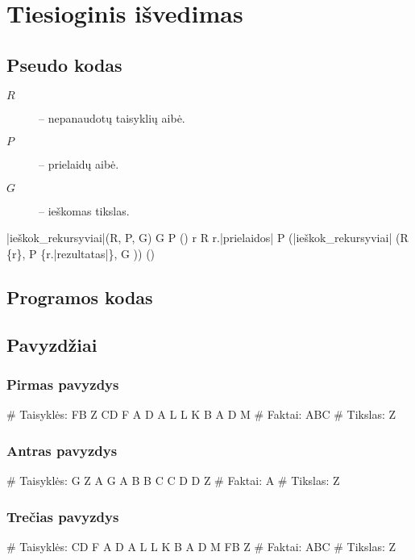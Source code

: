 \chapter{Tiesioginis išvedimas}

\section{Pseudo kodas}

\begin{description}
  \item[$R$] – nepanaudotų taisyklių aibė.
  \item[$P$] – prielaidų aibė.
  \item[$G$] – ieškomas tikslas.
\end{description}
\begin{program}
  \FUNCT |ieškok_rekursyviai|(R, P, G) \BODY
    \IF G \in P \THEN \EXIT(\true) \FI
    \FOREACH r \in R \; \DO
      \IF r.|prielaidos| \subseteq P
      \THEN \EXIT(|ieškok_rekursyviai|%
        (R \setminus \{r\}, P \cup \{r.|rezultatas|\}, G ))
      \FI
    \OD
    \EXIT(\false)%
  \ENDFUNCT
\end{program}

\section{Programos kodas}


\section{Pavyzdžiai}

\subsection{Pirmas pavyzdys}

\begin{pythonaienv}[fc]
# Taisyklės:
FB Z
CD F
A D
A L
L K
B A
D M
# Faktai:
ABC
# Tikslas:
Z
\end{pythonaienv}

\subsection{Antras pavyzdys}

\begin{pythonaienv}[fc]
# Taisyklės:
G Z
A G
A B
B C
C D
D Z
# Faktai:
A
# Tikslas:
Z
\end{pythonaienv}

\subsection{Trečias pavyzdys}

\begin{pythonaienv}[fc]
# Taisyklės:
CD F
A D
A L
L K
B A
D M
FB Z
# Faktai:
ABC
# Tikslas:
Z
\end{pythonaienv}
